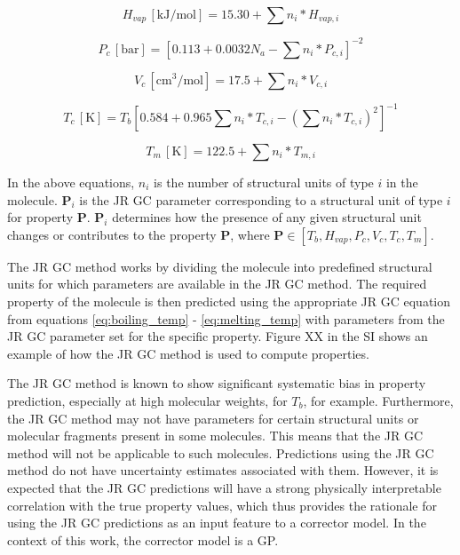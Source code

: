 \documentclass[journal=jacsat,manuscript=article]{achemso}
\begin{document}
\begin{equation}
    H_{vap} \, [\text{kJ/mol}] = 15.30 + \sum n_{i} * H_{vap,i}
    \label{eq:enthalpy_vap}
\end{equation}


\begin{equation}
    P_c \, [\text{bar}] = \left[ 0.113 + 0.0032 N_a - \sum n_{i} * P_{c,i} \right]^{-2}
    \label{eq:critical_pressure}
\end{equation}

\begin{equation}
    V_c \, [\text{cm}^3/\text{mol}] = 17.5 + \sum n_{i} * V_{c,i}
    \label{eq:critical_mol_vol}
\end{equation}

\begin{equation}
    T_c \, [\text{K}] = T_b \left[ 0.584 + 0.965 \sum n_{i} * T_{c,i} - \left( \sum n_{i} * T_{c,i} \right)^2 \right]^{-1}
    \label{eq:critical_temperature}
\end{equation}


\begin{equation}
    T_m \, [\text{K}] = 122.5 + \sum n_{i} * T_{m,i}
    \label{eq:melting_temp}
\end{equation}

In the above equations, $n_{i}$ is the number of structural units of type $i$ in the molecule. $\textbf{P}_i$ is the JR GC parameter corresponding to a structural unit of type $i$ for property $\textbf{P}$. $\textbf{P}_i$ determines how the presence of any given structural unit changes or contributes to the property $\textbf{P}$, where $\textbf{P} \in [T_b, H_{vap}, P_c,V_c, T_c, T_m]$.

The JR GC method works by dividing the molecule into predefined structural units for which parameters are available in the JR GC method. The required property of the molecule is then predicted using the appropriate JR GC equation from equations \ref{eq:boiling_temp} - \ref{eq:melting_temp} with parameters from the JR GC parameter set for the specific property. Figure XX in the SI shows an example of how the JR GC method is used to compute properties.

The JR GC method is known to show significant systematic bias in property prediction, especially at high molecular weights, for $T_b$, for example. Furthermore, the JR GC method may not have parameters for certain structural units or molecular fragments present in some molecules. This means that the JR GC method will not be applicable to such molecules. Predictions using the JR GC method do not have uncertainty estimates associated with them. However, it is expected that the JR GC predictions will have a strong physically interpretable correlation with the true property values, which thus provides the rationale for using the JR GC predictions as an input feature to a corrector model. In the context of this work, the corrector model is a GP.
\end{document}
